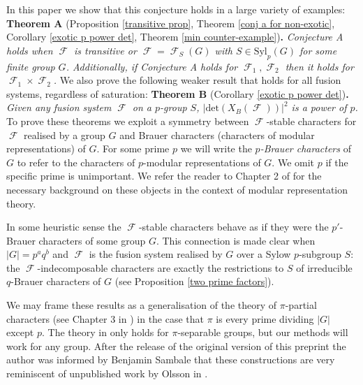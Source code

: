 \documentclass[12pt]{article}
\DeclareMathOperator{\sF}{\mathcal{F}}
\theoremstyle{plain}
\theoremstyle{definition}
\begin{document}
In this paper we show that this conjecture holds in a large variety of examples:
\newline\newline\textbf{Theorem A} (Proposition \ref{transitive prop}, Theorem \ref{conj a for non-exotic}, Corollary \ref{exotic p power det}, Theorem \ref{min counter-example})\textbf{.}
\textit{Conjecture A holds when $\sF$ is transitive or $\sF = \sF_S(G)$ with $S \in \text{Syl}_p(G)$ for some finite group $G$. Additionally, if Conjecture A holds for $\sF_1, \sF_2$ then it holds for $\sF_1 \times \sF_2$.}
\newline\newline
We also prove the following weaker result that holds for all fusion systems, regardless of saturation:\newline
\newline\textbf{Theorem B} (Corollary \ref{exotic p power det})\textbf{.}
\emph{Given any fusion system $\sF$ on a $p$-group $S$, $|\mathrm{det}(X_B(\sF))|^2$ is a power of $p$.}
\newline\newline
To prove these theorems we exploit a symmetry between $\sF$-stable characters for $\sF$ realised by a group $G$ and Brauer characters (characters of modular representations) of $G$.
For some prime $p$ we will write the \emph{$p$-Brauer characters} of $G$ to refer to the characters of $p$-modular representations of $G$. We omit $p$ if the specific prime is unimportant. We refer the reader to Chapter 2 of \cite{navarro} for the necessary background on these objects in the context of modular representation theory. 

In some heuristic sense the $\sF$-stable characters behave as if they were the $p'$-Brauer characters of some group $G$. This connection is made clear when $|G| = p^aq^b$ and $\sF$ is the fusion system realised by $G$ over a Sylow $p$-subgroup $S$: the $\sF$-indecomposable characters are exactly the restrictions to $S$ of irreducible $q$-Brauer characters of $G$ (see Proposition \ref{two prime factors}). 

We may frame these results as a generalisation of the theory of $\pi$-partial characters (see Chapter 3 in \cite{isaacs}) in the case that $\pi$ is every prime dividing $|G|$ except $p$. The theory in \cite{isaacs} only holds for $\pi$-separable groups, but our methods will work for any group. After the release of the original version of this preprint the author was informed by Benjamin Sambale that these constructions are very reminiscent of unpublished work by Olsson in \cite{olsson}.
\end{document}
